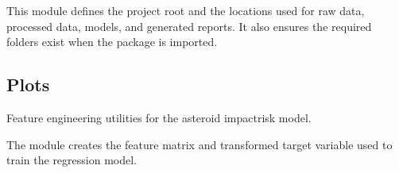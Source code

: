 \documentclass[letterpaper,10pt,english]{sphinxmanual}
\begin{document}
\sphinxAtStartPar
This module defines the project root and the locations used for raw data,
processed data, models, and generated reports. It also ensures the required
folders exist when the package is imported.


\subsection{Plots}
\label{\detokenize{modules:module-asteroid_impact.plots}}\label{\detokenize{modules:plots}}
\sphinxAtStartPar
Feature engineering utilities for the asteroid impact\sphinxhyphen{}risk model.

\sphinxAtStartPar
The module creates the feature matrix and transformed target variable used to
train the regression model.
\end{document}
